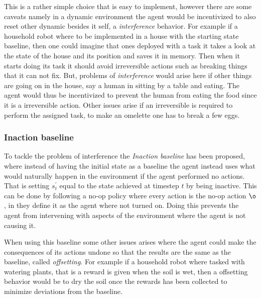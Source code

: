 \documentclass[12pt,A4]{report}
\theoremstyle{definition}
\begin{document}
This is a rather simple choice that is easy to implement, however there are some caveats namely in a dynamic environment the agent would be incentivized to also reset other dynamic besides it self, a \textit{interference} behavior. For example if a household robot where to be implemented in a house with the starting state baseline, then one could imagine that ones deployed with a task it takes a look at the state of the house and its position and saves it in memory. Then when it starts doing its task it should avoid irreversible actions such as breaking things that it can not fix. But, problems of \textit{interference} would arise here if other things are going on in the house, say a human in sitting by a table and eating. The agent would thus be incentivized to prevent the human from eating the food since it is a irreversible action. Other issues arise if an irreversible is required to perform the assigned task, to make an omelette one has to break a few eggs. 

\subsubsection{Inaction baseline}
To tackle the problem of interference the \textit{Inaction baseline} has been proposed, where instead of having the initial state as a baseline the agent instead uses what would naturally happen in the environment if the agent performed no actions. That is setting $s^\prime_t$ equal to the state achieved  at timestep $t$ by being inactive. This can be done by following a no-op policy where every action is the no-op action $\o$, in \autocite{Armstong Levinstein} they define it as the agent where not turned on. Doing this prevents the agent from intervening with aspects of the environment where the agent is not causing it.

When using this baseline some other issues arises where the agent could make the consequences of its actions undone so that the results are the same as the baseline, called \textit{offsetting}. For example if a household robot where tasked with watering plants, that is a reward is given when the soil is wet, then a offsetting behavior would be to dry the soil once the rewards has been collected to minimize deviations from the baseline. 
\end{document}
